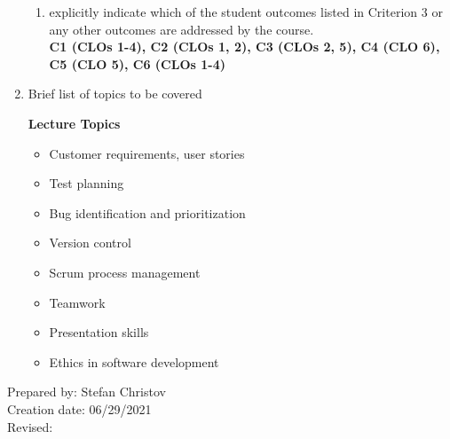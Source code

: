\begin{enumerate}[1.]
\begin{enumerate}
\item explicitly indicate which of the student outcomes listed in Criterion 3 or any other outcomes are addressed by the course.\\
  {\bfseries
    C1 (CLOs 1-4),
    C2 (CLOs 1, 2),
    C3 (CLOs 2, 5),
    C4 (CLO 6),
    C5 (CLO 5),
    C6 (CLOs 1-4)
  }
\end{enumerate}

\item Brief list of topics to be covered\\
  {\bfseries
    Lecture Topics
    \begin{itemize}
      \item Customer requirements, user stories
      \item Test planning
      \item Bug identification and prioritization
      \item Version control
      \item Scrum process management
      \item Teamwork
      \item Presentation skills
      \item Ethics in software development
    \end{itemize}
  }

\end{enumerate}

\noindent Prepared by: Stefan Christov\\
\noindent Creation date: 06/29/2021\\
\noindent Revised:\\
